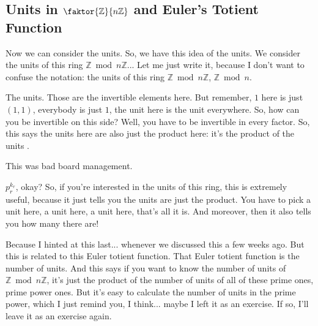 \begin{hidden}
\end{hidden}

\subsection{Units in \texorpdfstring{$\faktor{\mathbb{Z}}{n\mathbb{Z}}$}{Z/nZ} and Euler's Totient Function}

\begin{speech}[00:17:15 - 00:19:16]
Now we can consider the units. So, we have this idea of the units. We consider the units of this ring  $\mathbb{Z} \bmod n\mathbb{Z}$... Let me just write it, because I don't want to confuse the notation: the units of this ring $\mathbb{Z} \bmod n\mathbb{Z}$, $\mathbb{Z} \bmod n$.

The units. Those are the invertible elements here. But remember, $1$ here is just $(1, 1)$, everybody is just $1$, the unit here is the unit everywhere. So, how can you be invertible on this side? Well, you have to be invertible in every factor. So, this says the units here are also just the product here: it's the product of the units .

 This was bad board management.

$p_r^{k_r}$, okay? So, if you're interested in the units of this ring, this is extremely useful, because it just tells you the units are just the product. You have to pick a unit here, a unit here, a unit here, that's all it is. And moreover, then it also tells you how many there are!

Because I hinted at this last... whenever we discussed this a few weeks ago. But this is related to this Euler totient function. That Euler totient function is the number of units. And this says if you want to know the number of units of $\mathbb{Z} \bmod n\mathbb{Z}$, it's just the product of the number of units of all of these prime ones, prime power ones. But it's easy to calculate the number of units in the prime power, which I just remind you, I think... maybe I left it as an exercise. If so, I'll leave it as an exercise again.
\end{speech}

